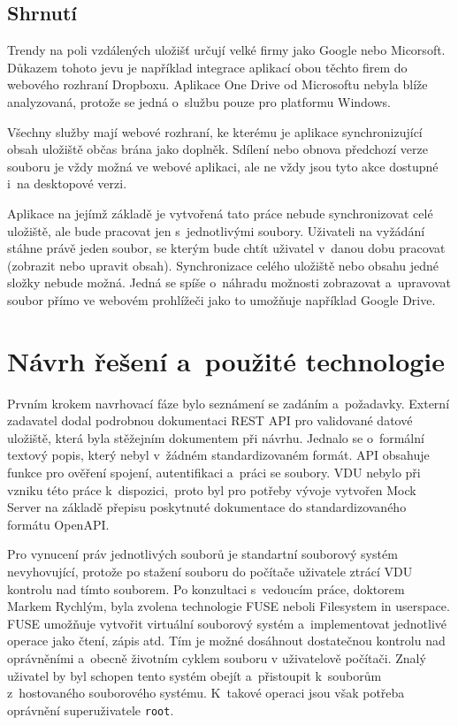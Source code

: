 \section{Shrnutí}

Trendy na poli vzdálených uložišť určují velké firmy jako Google nebo Micorsoft. Důkazem tohoto jevu je například integrace aplikací obou těchto firem do webového
rozhraní Dropboxu. Aplikace One Drive od Microsoftu nebyla blíže analyzovaná, protože se jedná o službu pouze pro platformu Windows. 

Všechny služby mají webové rozhraní, ke kterému je aplikace synchronizující obsah uložiště občas brána jako doplněk. Sdílení nebo obnova předchozí verze souboru
je vždy možná ve webové aplikaci, ale ne vždy jsou tyto akce dostupné i na desktopové verzi.

Aplikace na jejímž základě je vytvořená tato práce nebude synchronizovat celé uložiště, ale bude pracovat jen s jednotlivými soubory. Uživateli na vyžádání stáhne 
právě jeden soubor, se kterým bude chtít uživatel v danou dobu pracovat (zobrazit nebo upravit obsah). Synchronizace celého uložiště nebo obsahu jedné složky nebude možná.
Jedná se spíše o náhradu možnosti zobrazovat a upravovat soubor přímo ve webovém prohlížeči jako to umožňuje například Google Drive.

\chapter{Návrh řešení a použité technologie}

Prvním krokem navrhovací fáze bylo seznámení se zadáním a požadavky. Externí zadavatel dodal podrobnou dokumentaci REST API pro validované datové uložiště, která
byla stěžejním dokumentem při návrhu. Jednalo se o formální textový popis, který nebyl v žádném standardizovaném formát. API obsahuje funkce pro ověření spojení,
autentifikaci a práci se soubory. VDU nebylo při vzniku této práce k dispozici, proto byl pro potřeby vývoje vytvořen Mock Server na základě přepisu poskytnuté
dokumentace do standardizovaného formátu OpenAPI.

Pro vynucení práv jednotlivých souborů je standartní souborový systém nevyhovující, protože po stažení souboru do počítače uživatele ztrácí VDU kontrolu nad tímto
souborem. Po konzultaci s vedoucím práce, doktorem Markem Rychlým, byla zvolena technologie FUSE neboli Filesystem in userspace. FUSE umožňuje vytvořit virtuální
souborový systém a implementovat jednotlivé operace jako čtení, zápis atd. Tím je možné dosáhnout dostatečnou kontrolu nad oprávněními a obecně životním cyklem souboru
v uživatelově počítači. Znalý uživatel by byl schopen tento systém obejít a přistoupit k souborům z hostovaného souborového systému. K takové operaci jsou však potřeba 
oprávnění superuživatele \texttt{root}.

